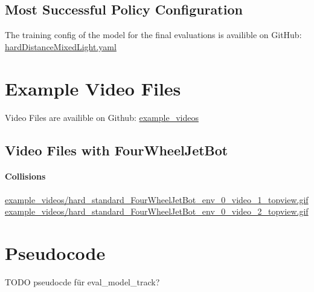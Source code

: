 \subsection{Most Successful Policy Configuration}
\label{cha:most_successful_config}

The training config of the model for the final evaluations is availible on GitHub:
\href{https://github.com/geschnee/carsim-rl-cnn/tree/main/python/cfg/hardDistanceMixedLight.yaml}{hardDistanceMixedLight.yaml}

\section{Example Video Files}
\label{cha:example_videos}

Video Files are availible on Github:
\href{https://github.com/geschnee/carsim-rl-cnn/tree/main/python/results/example_videos}{example\_videos}

\subsection{Video Files with FourWheelJetBot}

\paragraph{Collisions}
\label{sec:fourwheel_collisions}

\href{https://huggingface.co/geschnee/carsim-rl-cnn/blob/main/example_videos_FourWheelJetbot/hard_standard_FourWheelJetBot_env_0_video_1_topview.gif}{example\_videos/hard\_standard\_FourWheelJetBot\_env\_0\_video\_1\_topview.gif}
\href{https://huggingface.co/geschnee/carsim-rl-cnn/blob/main/example_videos_FourWheelJetbot/hard_standard_FourWheelJetBot_env_0_video_2_topview.gif}{example\_videos/hard\_standard\_FourWheelJetBot\_env\_0\_video\_2\_topview.gif}







\section{Pseudocode}

TODO pseudocde für eval\_model\_track?

